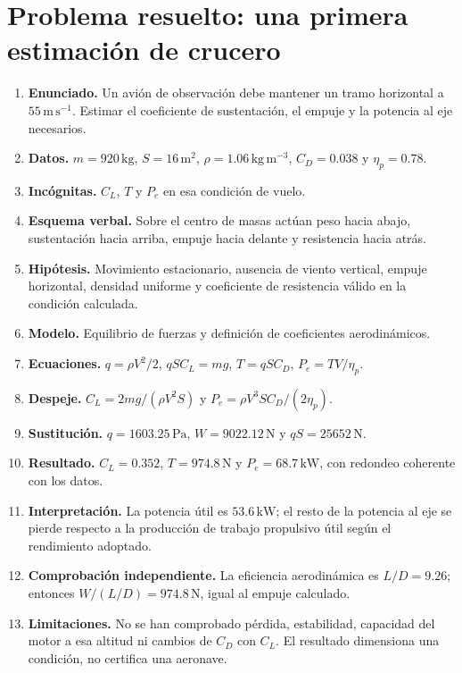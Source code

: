 \section{Problema resuelto: una primera estimación de crucero}
\begin{enumerate}
\item \textbf{Enunciado.} Un avión de observación debe mantener un tramo horizontal a $55\,\mathrm{m\,s^{-1}}$. Estimar el coeficiente de sustentación, el empuje y la potencia al eje necesarios.
\item \textbf{Datos.} $m=920\,\mathrm{kg}$, $S=16\,\mathrm{m^2}$, $\rho=1.06\,\mathrm{kg\,m^{-3}}$, $C_D=0.038$ y $\eta_p=0.78$.
\item \textbf{Incógnitas.} $C_L$, $T$ y $P_e$ en esa condición de vuelo.
\item \textbf{Esquema verbal.} Sobre el centro de masas actúan peso hacia abajo, sustentación hacia arriba, empuje hacia delante y resistencia hacia atrás.
\item \textbf{Hipótesis.} Movimiento estacionario, ausencia de viento vertical, empuje horizontal, densidad uniforme y coeficiente de resistencia válido en la condición calculada.
\item \textbf{Modelo.} Equilibrio de fuerzas y definición de coeficientes aerodinámicos.
\item \textbf{Ecuaciones.} $q=\rho V^2/2$, $qSC_L=mg$, $T=qSC_D$, $P_e=TV/\eta_p$.
\item \textbf{Despeje.} $C_L=2mg/(\rho V^2S)$ y $P_e=\rho V^3SC_D/(2\eta_p)$.
\item \textbf{Sustitución.} $q=1603.25\,\mathrm{Pa}$, $W=9022.12\,\mathrm{N}$ y $qS=25652\,\mathrm{N}$.
\item \textbf{Resultado.} $C_L=0.352$, $T=974.8\,\mathrm{N}$ y $P_e=68.7\,\mathrm{kW}$, con redondeo coherente con los datos.
\item \textbf{Interpretación.} La potencia útil es $53.6\,\mathrm{kW}$; el resto de la potencia al eje se pierde respecto a la producción de trabajo propulsivo útil según el rendimiento adoptado.
\item \textbf{Comprobación independiente.} La eficiencia aerodinámica es $L/D=9.26$; entonces $W/(L/D)=974.8\,\mathrm{N}$, igual al empuje calculado.
\item \textbf{Limitaciones.} No se han comprobado pérdida, estabilidad, capacidad del motor a esa altitud ni cambios de $C_D$ con $C_L$. El resultado dimensiona una condición, no certifica una aeronave.
\end{enumerate}

